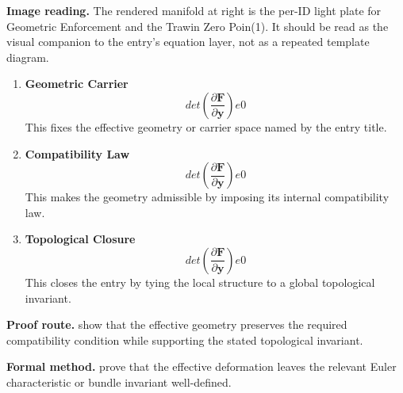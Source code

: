 \begin{samepage}
\noindent\begin{minipage}[t]{0.45\linewidth}
\vspace{0pt}
\raggedright
\scriptsize\textbf{Image reading.} The rendered manifold at right is the per-ID light plate for Geometric Enforcement and the Trawin Zero Poin(1). It should be read as the visual companion to the entry's equation layer, not as a repeated template diagram.\par
\end{minipage}\hfill
\begin{minipage}[t]{0.53\linewidth}
\vspace*{-0.10in}
\raggedright
{}
\end{minipage}
\end{samepage}

\clearpage


\begin{enumerate}[leftmargin=1.6em,itemsep=9pt,topsep=6pt]
\item \textbf{Geometric Carrier}
\[
det(\frac{\partial \mathbf{F}}{\partial \mathbf{y}}) e 0
\]
This fixes the effective geometry or carrier space named by the entry title.

\item \textbf{Compatibility Law}
\[
det(\frac{\partial \mathbf{F}}{\partial \mathbf{y}}) e 0
\]
This makes the geometry admissible by imposing its internal compatibility law.

\item \textbf{Topological Closure}
\[
det(\frac{\partial \mathbf{F}}{\partial \mathbf{y}}) e 0
\]
This closes the entry by tying the local structure to a global topological invariant.
\end{enumerate}

\textbf{Proof route.} show that the effective geometry preserves the required compatibility condition while supporting the stated topological invariant.

\textbf{Formal method.} prove that the effective deformation leaves the relevant Euler characteristic or bundle invariant well-defined.

\medskip
{}

